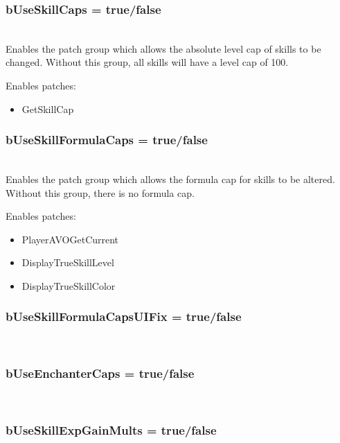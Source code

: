 \documentclass[12pt]{amsart}
\begin{document}
\subsubsection{bUseSkillCaps = \textlangle true/false\textrangle}\hfill\\

Enables the patch group which allows the absolute level cap of skills to be
changed. Without this group, all skills will have a level cap of 100.

Enables patches:
\begin{itemize}
    \item GetSkillCap
\end{itemize}
\stopblock

\startblock
\subsubsection{bUseSkillFormulaCaps = \textlangle true/false\textrangle}\hfill\\

Enables the patch group which allows the formula cap for skills to be altered.
Without this group, there is no formula cap.

Enables patches:
\begin{itemize}
    \item PlayerAVOGetCurrent
    \item DisplayTrueSkillLevel
    \item DisplayTrueSkillColor
\end{itemize}
\stopblock

\startblock
\subsubsection{bUseSkillFormulaCapsUIFix = \textlangle true/false\textrangle}\hfill\\

\subsubsection{bUseEnchanterCaps = \textlangle true/false\textrangle}\hfill\\

\subsubsection{bUseSkillExpGainMults = \textlangle true/false\textrangle}\hfill\\
\end{document}
